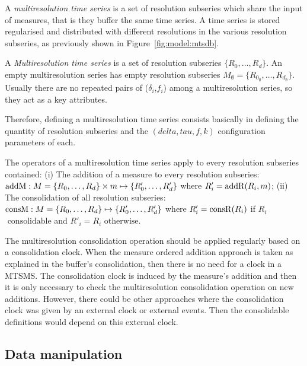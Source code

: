 A \emph{multiresolution time series} is a set of resolution subseries
which share the input of measures, that is they buffer the same time
series. A time series is stored regularised and distributed with
different resolutions in the various resolution subseries, as
previously shown in Figure~\ref{fig:model:mtsdb}.
\begin{definition}%
  A \emph{Mul\-ti\-re\-solution time series} is a set of resolution
  subseries $\{R_0, \dots, R_d\}$.  An empty multiresolution series
  has empty resolution subseries $M_{\emptyset}=\{R_{0_\emptyset},
  \dots, R_{d_\emptyset}\}$. Usually there are no repeated pairs of
  ($\delta_i$,$f_i$) among a multiresolution series, so they act as a
  key attributes.
\end{definition}

Therefore, defining a multiresolution time series consists basically
in defining the quantity of resolution subseries and the $(delta,tau,f,k)$
configuration parameters of each.


The operators of a multiresolution time series apply to every
resolution subseries contained: (i) The addition of a measure to every
resolution subseries: $\operatorname{addM} : M=\{R_0,\allowbreak \dots,\allowbreak
R_d\} \times m \mapsto \{R'_0, \dots,\allowbreak R'_d\}$ where
$R'_i=\operatorname{addR}(R_i,m)$; (ii) The consolidation of all resolution
subseries: $\operatorname{consM} : M=\{R_0,\allowbreak \dots,\allowbreak R_d\}
\mapsto \{R'_0,\allowbreak \dots,\allowbreak R'_d\}$ where $R'_i =
\operatorname{consR}(R_i)$ if $R_i$ $\text{ consolidable}$ and $R'_i=R_i$
$\text{otherwise}$.


The multiresolution consolidation operation should be applied
regularly based on a consolidation clock. When the measure ordered
addition approach is taken as explained in the buffer's consolidation,
then there is no need for a clock in a MTSMS. The consolidation clock
is induced by the measure's addition and then it is only necessary to
check the multiresolution consolidation operation on new
additions. However, there could be other approaches where the
consolidation clock was given by an external clock or external
events. Then the consolidable definitions would depend on this
external clock.


\subsection{Data manipulation}





